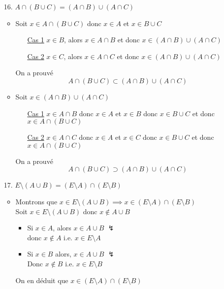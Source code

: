 \begin{prv}
	\begin{enumerate}
		\item[16.] $A \cap (B \cup C)= (A\cap B)\cup (A\cap C)$ 
			\begin{itemize}
				\item Soit $x \in A \cap (B \cup C)$ donc $x \in A$ et $x \in B \cup C$ \\
					\begin{itemize}
						\item[\underline{\sc Cas 1}] $x \in B$, alors $x \in A \cap B$ et donc $x \in (A\cap B)\cup (A\cap C)$ 
						\item[\underline{\sc Cas 2}] $x \in C$, alors $x \in A \cap C$ et donc $x \in (A\cap B)\cup (A\cap C)$
					\end{itemize}
					On a prouvé \[
						A \cap (B \cup C) \subset (A \cap B) \cup (A \cap C)
					\]
				\item Soit $x \in (A \cap B) \cup (A \cap C)$ 
					\begin{itemize}
						\item[\underline{\sc Cas 1}]$x \in A\cap B$ donc $x \in A$ et $x \in B$ donc $x \in B \cup C$ et donc $x \in A \cap (B\cup C)$
						\item[\underline{\sc Cas 2}]$x \in A\cap C$ donc $x \in A$ et $x \in C$ donc $x \in B \cup C$ et donc $x \in A \cap (B\cup C)$
					\end{itemize}
					On a prouvé \[
						A \cap (B \cup C) \supset (A \cap B) \cup (A \cap C)
					\]
			\end{itemize}
		\item[17.] $E \setminus (A\cup B) = (E\setminus A) \cap (E\setminus B)$ 
			\begin{itemize}
				\item Montrons que $x \in E\setminus(A\cup B) \implies x \in (E\setminus A)\cap (E\setminus B)$ \\
					Soit $x \in  E\setminus(A\cup B)$ donc $x \not\in A \cup B$
					\begin{itemize}
						\item Si $x \in A$, alors $x \in A \cup B$ $\lightning$\\
							donc $x \not\in A$ i.e. $x \in E\setminus A$ 
						\item Si $x \in B$ alors, $x \in A\cup B$ $\lightning$ \\
							Donc $x \not\in B$ i.e. $x \in E\setminus B$
					\end{itemize}
					On en déduit que $x \in (E\setminus A)\cap (E\setminus B)$

\end{itemize}
\end{enumerate}
\end{prv}

